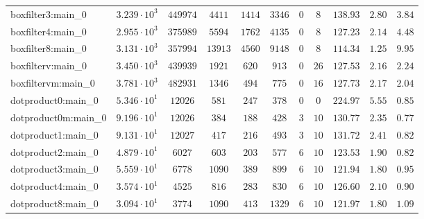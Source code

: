\begin{tabular}{|l|c|c|c|c|c|c|c|c|c|c|}
boxfilter3:main\_0             & $ 3.239 \cdot 10^{3} $ & $ 449974   $ & $ 4411   $ & $ 1414   $ & $ 3346   $ & $ 0    $ & $ 8    $ & $ 138.93      $ & $ 2.80    $ & $ 3.84    $ \\
boxfilter4:main\_0             & $ 2.955 \cdot 10^{3} $ & $ 375989   $ & $ 5594   $ & $ 1762   $ & $ 4135   $ & $ 0    $ & $ 8    $ & $ 127.23      $ & $ 2.14    $ & $ 4.48    $ \\
boxfilter8:main\_0             & $ 3.131 \cdot 10^{3} $ & $ 357994   $ & $ 13913  $ & $ 4560   $ & $ 9148   $ & $ 0    $ & $ 8    $ & $ 114.34      $ & $ 1.25    $ & $ 9.95    $ \\
boxfilterv:main\_0             & $ 3.450 \cdot 10^{3} $ & $ 439939   $ & $ 1921   $ & $ 620    $ & $ 913    $ & $ 0    $ & $ 26   $ & $ 127.53      $ & $ 2.16    $ & $ 2.24    $ \\
boxfiltervm:main\_0            & $ 3.781 \cdot 10^{3} $ & $ 482931   $ & $ 1346   $ & $ 494    $ & $ 775    $ & $ 0    $ & $ 16   $ & $ 127.73      $ & $ 2.17    $ & $ 2.04    $ \\
dotproduct0:main\_0            & $ 5.346 \cdot 10^{1} $ & $ 12026    $ & $ 581    $ & $ 247    $ & $ 378    $ & $ 0    $ & $ 0    $ & $ 224.97      $ & $ 5.55    $ & $ 0.85    $ \\
dotproduct0m:main\_0           & $ 9.196 \cdot 10^{1} $ & $ 12026    $ & $ 384    $ & $ 188    $ & $ 428    $ & $ 3    $ & $ 10   $ & $ 130.77      $ & $ 2.35    $ & $ 0.77    $ \\
dotproduct1:main\_0            & $ 9.131 \cdot 10^{1} $ & $ 12027    $ & $ 417    $ & $ 216    $ & $ 493    $ & $ 3    $ & $ 10   $ & $ 131.72      $ & $ 2.41    $ & $ 0.82    $ \\
dotproduct2:main\_0            & $ 4.879 \cdot 10^{1} $ & $ 6027     $ & $ 603    $ & $ 203    $ & $ 577    $ & $ 6    $ & $ 10   $ & $ 123.53      $ & $ 1.90    $ & $ 0.82    $ \\
dotproduct3:main\_0            & $ 5.559 \cdot 10^{1} $ & $ 6778     $ & $ 1090   $ & $ 389    $ & $ 899    $ & $ 6    $ & $ 10   $ & $ 121.94      $ & $ 1.80    $ & $ 0.95    $ \\
dotproduct4:main\_0            & $ 3.574 \cdot 10^{1} $ & $ 4525     $ & $ 816    $ & $ 283    $ & $ 830    $ & $ 6    $ & $ 10   $ & $ 126.60      $ & $ 2.10    $ & $ 0.90    $ \\
dotproduct8:main\_0            & $ 3.094 \cdot 10^{1} $ & $ 3774     $ & $ 1090   $ & $ 413    $ & $ 1329   $ & $ 6    $ & $ 10   $ & $ 121.97      $ & $ 1.80    $ & $ 1.09    $ \\

\end{tabular}
